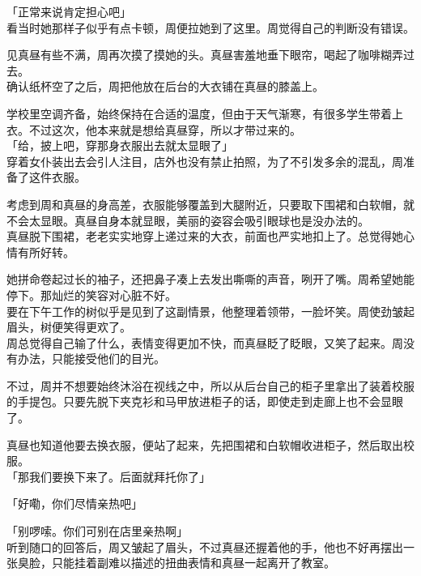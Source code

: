 「正常来说肯定担心吧」\\

看当时她那样子似乎有点卡顿，周便拉她到了这里。周觉得自己的判断没有错误。

见真昼有些不满，周再次摸了摸她的头。真昼害羞地垂下眼帘，喝起了咖啡糊弄过去。\\

确认纸杯空了之后，周把他放在后台的大衣铺在真昼的膝盖上。

学校里空调齐备，始终保持在合适的温度，但由于天气渐寒，有很多学生带着上衣。不过这次，他本来就是想给真昼穿，所以才带过来的。\\

「给，披上吧，穿那身衣服出去就太显眼了」\\

穿着女仆装出去会引人注目，店外也没有禁止拍照，为了不引发多余的混乱，周准备了这件衣服。

考虑到周和真昼的身高差，衣服能够覆盖到大腿附近，只要取下围裙和白软帽，就不会太显眼。真昼自身本就显眼，美丽的姿容会吸引眼球也是没办法的。\\

真昼脱下围裙，老老实实地穿上递过来的大衣，前面也严实地扣上了。总觉得她心情有所好转。

她拼命卷起过长的袖子，还把鼻子凑上去发出嘶嘶的声音，咧开了嘴。周希望她能停下。那灿烂的笑容对心脏不好。\\

要在下午工作的树似乎是见到了这副情景，他整理着领带，一脸坏笑。周使劲皱起眉头，树便笑得更欢了。\\

周总觉得自己输了什么，表情变得更加不快，而真昼眨了眨眼，又笑了起来。周没有办法，只能接受他们的目光。

不过，周并不想要始终沐浴在视线之中，所以从后台自己的柜子里拿出了装着校服的手提包。只要先脱下夹克衫和马甲放进柜子的话，即使走到走廊上也不会显眼了。

真昼也知道他要去换衣服，便站了起来，先把围裙和白软帽收进柜子，然后取出校服。\\

「那我们要换下来了。后面就拜托你了」

「好嘞，你们尽情亲热吧」

「别啰嗦。你们可别在店里亲热啊」\\

听到随口的回答后，周又皱起了眉头，不过真昼还握着他的手，他也不好再摆出一张臭脸，只能挂着副难以描述的扭曲表情和真昼一起离开了教室。\\

